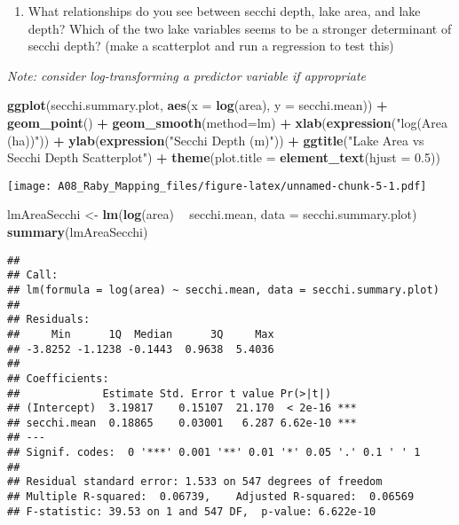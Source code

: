\documentclass[]{article}
\newenvironment{Shaded}{\begin{snugshade}}{\end{snugshade}}
\newcommand{\DataTypeTok}[1]{\textcolor[rgb]{0.13,0.29,0.53}{#1}}
\newcommand{\FloatTok}[1]{\textcolor[rgb]{0.00,0.00,0.81}{#1}}
\newcommand{\KeywordTok}[1]{\textcolor[rgb]{0.13,0.29,0.53}{\textbf{#1}}}
\newcommand{\NormalTok}[1]{#1}
\newcommand{\OperatorTok}[1]{\textcolor[rgb]{0.81,0.36,0.00}{\textbf{#1}}}
\newcommand{\StringTok}[1]{\textcolor[rgb]{0.31,0.60,0.02}{#1}}
\providecommand{\tightlist}{%
  \setlength{\itemsep}{0pt}\setlength{\parskip}{0pt}}
\begin{document}
\begin{enumerate}
\def\labelenumi{\arabic{enumi}.}
\setcounter{enumi}{8}
\tightlist
\item
  What relationships do you see between secchi depth, lake area, and
  lake depth? Which of the two lake variables seems to be a stronger
  determinant of secchi depth? (make a scatterplot and run a regression
  to test this)
\end{enumerate}

\emph{Note: consider log-transforming a predictor variable if
appropriate}

\begin{Shaded}
\begin{Highlighting}[]
\KeywordTok{ggplot}\NormalTok{(secchi.summary.plot, }\KeywordTok{aes}\NormalTok{(}\DataTypeTok{x =} \KeywordTok{log}\NormalTok{(area), }\DataTypeTok{y =}\NormalTok{ secchi.mean)) }\OperatorTok{+}
\StringTok{  }\KeywordTok{geom_point}\NormalTok{() }\OperatorTok{+}
\StringTok{  }\KeywordTok{geom_smooth}\NormalTok{(}\DataTypeTok{method=}\NormalTok{lm) }\OperatorTok{+}
\StringTok{  }\KeywordTok{xlab}\NormalTok{(}\KeywordTok{expression}\NormalTok{(}\StringTok{"log(Area (ha))"}\NormalTok{)) }\OperatorTok{+}
\StringTok{  }\KeywordTok{ylab}\NormalTok{(}\KeywordTok{expression}\NormalTok{(}\StringTok{"Secchi Depth (m)"}\NormalTok{)) }\OperatorTok{+}
\StringTok{  }\KeywordTok{ggtitle}\NormalTok{(}\StringTok{"Lake Area vs Secchi Depth Scatterplot"}\NormalTok{) }\OperatorTok{+}
\StringTok{  }\KeywordTok{theme}\NormalTok{(}\DataTypeTok{plot.title =} \KeywordTok{element_text}\NormalTok{(}\DataTypeTok{hjust =} \FloatTok{0.5}\NormalTok{))}
\end{Highlighting}
\end{Shaded}

\texttt{[image: A08\_Raby\_Mapping\_files/figure-latex/unnamed-chunk-5-1.pdf]}

\begin{Shaded}
\begin{Highlighting}[]
\NormalTok{lmAreaSecchi <-}\StringTok{ }\KeywordTok{lm}\NormalTok{(}\KeywordTok{log}\NormalTok{(area) }\OperatorTok{~}\StringTok{ }\NormalTok{secchi.mean, }\DataTypeTok{data =}\NormalTok{ secchi.summary.plot)}
\KeywordTok{summary}\NormalTok{(lmAreaSecchi)}
\end{Highlighting}
\end{Shaded}

\begin{verbatim}
## 
## Call:
## lm(formula = log(area) ~ secchi.mean, data = secchi.summary.plot)
## 
## Residuals:
##     Min      1Q  Median      3Q     Max 
## -3.8252 -1.1238 -0.1443  0.9638  5.4036 
## 
## Coefficients:
##             Estimate Std. Error t value Pr(>|t|)    
## (Intercept)  3.19817    0.15107  21.170  < 2e-16 ***
## secchi.mean  0.18865    0.03001   6.287 6.62e-10 ***
## ---
## Signif. codes:  0 '***' 0.001 '**' 0.01 '*' 0.05 '.' 0.1 ' ' 1
## 
## Residual standard error: 1.533 on 547 degrees of freedom
## Multiple R-squared:  0.06739,    Adjusted R-squared:  0.06569 
## F-statistic: 39.53 on 1 and 547 DF,  p-value: 6.622e-10
\end{verbatim}
\end{document}
